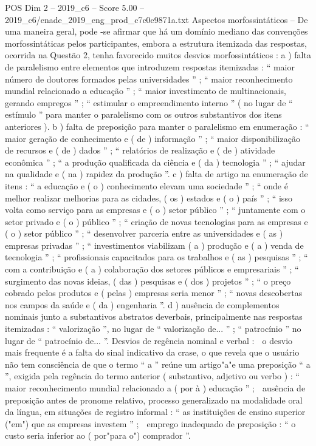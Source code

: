 \begin{textsample}{POS Dim 2 – 2019\_c6 – Score 5.00 – 2019\_c6/enade\_2019\_eng\_prod\_c7c0e9871a.txt}
Aspectos morfossintáticos – De uma maneira geral, pode -se afirmar que há um domínio mediano das convenções morfossintáticas pelos participantes, embora a estrutura itemizada das respostas, ocorrida na Questão 2, tenha favorecido muitos desvios morfossintáticos : a ) falta de paralelismo entre elementos que introduzem respostas itemizadas : “ maior número de doutores formados pelas universidades ” ; “ maior reconhecimento mundial relacionado a educação ” ; “ maior investimento de multinacionais, gerando empregos ” ; “ estimular o empreendimento interno ” ( no lugar de “ estímulo ” para manter o paralelismo com os outros substantivos dos itens anteriores ). b ) falta de preposição para manter o paralelismo em enumeração : “ maior geração de conhecimento e ( de ) informação ” ; “ maior disponibilização de recursos e ( de ) dados ” ; “ relatórios de realização e ( de ) atividade econômica ” ; “ a produção qualificada da ciência e ( da ) tecnologia ” ; “ ajudar na qualidade e ( na ) rapidez da produção ”. c ) falta de artigo na enumeração de itens : “ a educação e ( o ) conhecimento elevam uma sociedade ” ; “ onde é melhor realizar melhorias para as cidades, ( os ) estados e ( o ) país ” ; “ isso volta como serviço para as empresas e ( o ) setor público ” ; “ juntamente com o setor privado e ( o ) público ” ; “ criação de novas tecnologias para as empresas e ( o ) setor público ” ; “ desenvolver parceria entre as universidades e ( as ) empresas privadas ” ; “ investimentos viabilizam ( a ) produção e ( a ) venda de tecnologia ” ; “ profissionais capacitados para os trabalhos e ( as ) pesquisas ” ; “ com a contribuição e ( a ) colaboração dos setores públicos e empresariais ” ; “ surgimento das novas ideias, ( das ) pesquisas e ( dos ) projetos ” ; “ o preço cobrado pelos produtos e ( pelas ) empresas seria menor ” ; “ novas descobertas nos campos da saúde e ( da ) engenharia ”. d ) ausência de complementos nominais junto a substantivos abstratos deverbais, principalmente nas respostas itemizadas : “ valorização ”, no lugar de “ valorização de... ” ; “ patrocínio ” no lugar de “ patrocínio de... ”.
Desvios de regência nominal e verbal :  o desvio mais frequente é a falta do sinal indicativo da crase, o que revela que o usuário não tem consciência de que o termo “ a ” reúne um artigo"a"e uma preposição “ a ”, exigida pela regência do termo anterior ( substantivo, adjetivo ou verbo ) : “ maior reconhecimento mundial relacionado a ( por à ) educação ” ;  ausência de preposição antes de pronome relativo, processo generalizado na modalidade oral da língua, em situações de registro informal : “ as instituições de ensino superior ("em") que as empresas investem ” ;  emprego inadequado de preposição : “ o custo seria inferior ao ( por"para o") comprador ”.

\end{textsample}
